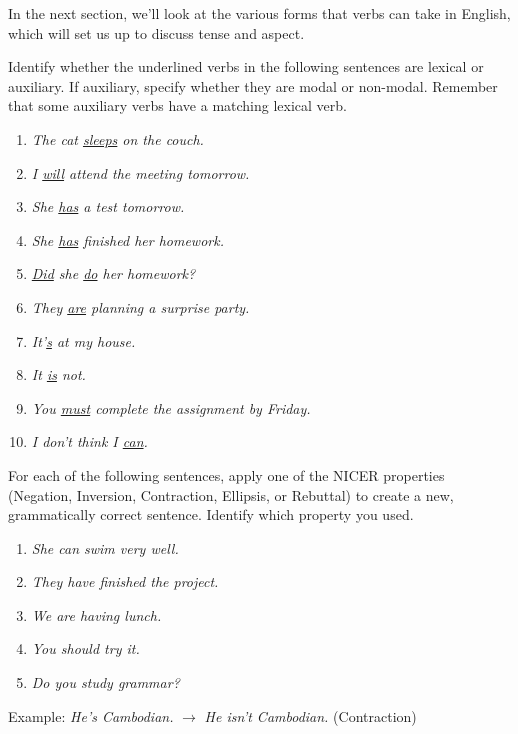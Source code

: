In the next section, we'll look at the various forms that verbs can take in English, which will set us up to discuss tense and aspect.

\begin{tcolorbox}[title=Exercise: Basic Verb Types, colback=white, colframe=blue!75!black, fonttitle=\bfseries]
Identify whether the underlined verbs in the following sentences are lexical or auxiliary. If auxiliary, specify whether they are modal or non-modal. Remember that some auxiliary verbs have a matching lexical verb.

\begin{enumerate}[nosep]
    \item \textit{The cat \uline{sleeps} on the couch.}
    \item \textit{I \uline{will} attend the meeting tomorrow.}
    \item \textit{She \uline{has} a test tomorrow.}
    \item \textit{She \uline{has} finished her homework.}
    \item \textit{\uline{Did} she \uline{do} her homework?}
    \item \textit{They \uline{are} planning a surprise party.}
    \item \textit{It'\uline{s} at my house.}
    \item \textit{It \uline{is} not.}
    \item \textit{You \uline{must} complete the assignment by Friday.}
    \item \textit{I don't think I \uline{can}.}
\end{enumerate}
For each of the following sentences, apply one of the NICER properties (Negation, Inversion, Contraction, Ellipsis, or Rebuttal) to create a new, grammatically correct sentence. Identify which property you used.

\begin{enumerate}[nosep]
    \item \textit{She can swim very well.}
    \item \textit{They have finished the project.}
    \item \textit{We are having lunch.}
    \item \textit{You should try it.}
    \item \textit{Do you study grammar?}
\end{enumerate}

Example: \textit{He's Cambodian.} $\rightarrow$ \textit{He isn't Cambodian.} (Contraction)
\end{tcolorbox}

